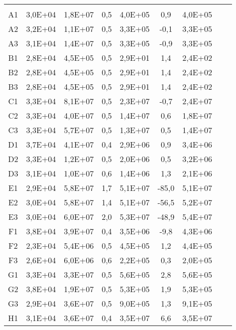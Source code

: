 \begin{center}
\begin{longtable}{ccccccccc}
\toprule
\endhead
\midrule \\ %
\endfoot
\bottomrule 
\endlastfoot
    A1    & 3,0E+04 & 1,8E+07 & 0,5   & 4,0E+05 & 0,9   & 4,0E+05 \\
    A2    & 3,2E+04 & 1,1E+07 & 0,5   & 3,3E+05 & -0,1  & 3,3E+05 \\
    A3    & 3,1E+04 & 1,4E+07 & 0,5   & 3,3E+05 & -0,9  & 3,3E+05 \\
    B1    & 2,8E+04 & 4,5E+05 & 0,5   & 2,9E+01 & 1,4   & 2,4E+02 \\
    B2    & 2,8E+04 & 4,5E+05 & 0,5   & 2,9E+01 & 1,4   & 2,4E+02 \\
    B3    & 2,8E+04 & 4,5E+05 & 0,5   & 2,9E+01 & 1,4   & 2,4E+02 \\
    C1    & 3,3E+04 & 8,1E+07 & 0,5   & 2,3E+07 & -0,7  & 2,4E+07 \\
    C2    & 3,3E+04 & 4,0E+07 & 0,5   & 1,4E+07 & 0,6   & 1,8E+07 \\
    C3    & 3,3E+04 & 5,7E+07 & 0,5   & 1,3E+07 & 0,5   & 1,4E+07 \\
    D1    & 3,7E+04 & 4,1E+07 & 0,4   & 2,9E+06 & 0,9   & 3,4E+06 \\
    D2    & 3,3E+04 & 1,2E+07 & 0,5   & 2,0E+06 & 0,5   & 3,2E+06 \\
    D3    & 3,1E+04 & 1,0E+07 & 0,6   & 1,4E+06 & 1,3   & 2,1E+06 \\
    E1    & 2,9E+04 & 5,8E+07 & 1,7   & 5,1E+07 & -85,0 & 5,1E+07 \\
    E2    & 3,0E+04 & 5,8E+07 & 1,4   & 5,1E+07 & -56,5 & 5,2E+07 \\
    E3    & 3,0E+04 & 6,0E+07 & 2,0   & 5,3E+07 & -48,9 & 5,4E+07 \\
    F1    & 3,8E+04 & 3,9E+07 & 0,4   & 3,5E+06 & -9,8  & 4,3E+06 \\
    F2    & 2,3E+04 & 5,4E+06 & 0,5   & 4,5E+05 & 1,2   & 4,4E+05 \\
    F3    & 2,6E+04 & 6,0E+06 & 0,6   & 2,2E+05 & 0,3   & 2,0E+05 \\
    G1    & 3,3E+04 & 3,3E+07 & 0,5   & 5,6E+05 & 2,8   & 5,6E+05 \\
    G2    & 3,8E+04 & 1,9E+07 & 0,5   & 5,3E+05 & 1,9   & 5,3E+05 \\
    G3    & 2,9E+04 & 3,6E+07 & 0,5   & 9,0E+05 & 1,3   & 9,1E+05 \\
    H1    & 3,1E+04 & 3,6E+07 & 0,4   & 3,5E+07 & 6,6   & 3,5E+07 \\

\end{longtable}
\end{center}
